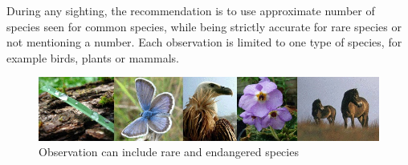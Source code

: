 During any sighting, the recommendation is to use approximate number of species
seen for common species, while being strictly accurate for rare species or not
mentioning a number. Each observation is limited to one type of species, for
example birds, plants or mammals.

\begin{figure}[htb]
	\centering
	\includegraphics[width=1\textwidth]{prestudy/field_study/flora_fauna_Nikola.jpg}
	\caption{Observation can include rare and endangered species}
	\label{fig:field_study_species}
\end{figure}


